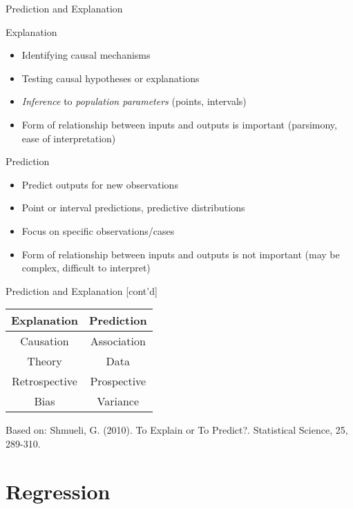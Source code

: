 \documentclass[ignorenonframetext,xcolor=x11names]{beamer}
\begin{document}
\begin{frame}{Prediction and Explanation}
\begin{block}{Explanation}
  \begin{itemize}
     \item Identifying causal mechanisms
     \item Testing causal hypotheses or explanations
     \item \emph{Inference} to \emph{population parameters} (points, intervals)
     \item Form of relationship between inputs and outputs is important (parsimony, ease of interpretation)
  \end{itemize}
\end{block}

\begin{block}{Prediction}
  \begin{itemize}
     \item Predict outputs for new observations
     \item Point or interval predictions, predictive distributions
     \item Focus on specific observations/cases
     \item Form of relationship between inputs and outputs is not important (may be complex, difficult to interpret)
  \end{itemize}
\end{block}
\end{frame}

\begin{frame}{Prediction and Explanation \small [cont'd]}
\begin{center}
\renewcommand{\arraystretch}{1.25}

\begin{tabular}{c|c} \hline
\textbf{Explanation} & \textbf{Prediction} \\ \hline
Causation & Association \\
Theory & Data \\
Retrospective & Prospective \\
Bias & Variance \\ \hline
\end{tabular}
\end{center}
\vspace{5mm}
\small{Based on: Shmueli, G. (2010). To Explain or To Predict?. Statistical Science, 25, 289-310.}
\end{frame}

\section{Regression}
\end{document}
